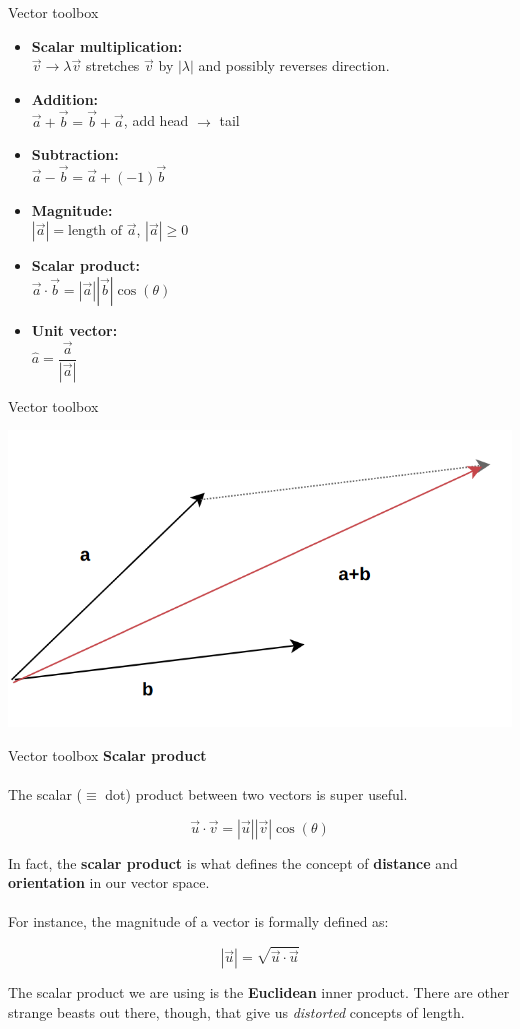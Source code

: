 \documentclass{beamer}
\begin{document}
\begin{frame}{Vector toolbox}
	\begin{itemize}
		\item \textbf{Scalar multiplication: }\\$\vec{v} \to \lambda \vec{v}$ stretches $\vec{v}$ by $|\lambda|$ and possibly reverses direction.
		\item \textbf{Addition: }\\$\vec{a} + \vec{b} = \vec{b} + \vec{a}$, add head $\to$ tail
		\item \textbf{Subtraction: }\\ $\vec{a} - \vec{b} = \vec{a} + (-1)\vec{b}$
		\item \textbf{Magnitude: }\\$|\vec{a}| = \text{length of }\vec{a}$, $|\vec{a}| \ge 0$
		\item \textbf{Scalar product: }\\ $\vec{a}\cdot\vec{b} = |\vec{a}||\vec{b}|\cos(\theta)$
		\item \textbf{Unit vector: }\\ $\hat{a} = \dfrac{\vec{a}}{|\vec{a}|}$
	\end{itemize}
\end{frame}

\begin{frame}{Vector toolbox}
	\begin{center}
	\includegraphics[width = 0.75\linewidth]{img/vector_addition.png}
	\end{center}
\end{frame}

\begin{frame}{Vector toolbox}
	\textbf{Scalar product}\\~\\
	The scalar ($\equiv$ dot) product between two vectors is super useful.
	
	$$\vec{u} \cdot \vec{v} = |\vec{u}||\vec{v}|\cos(\theta)$$
	
	In fact, the \textbf{scalar product} is what defines the concept of \textbf{distance} and \textbf{orientation} in our vector space.
	\\~\\
	For instance, the magnitude of a vector is formally defined as:
	
	$$|\vec{u}| = \sqrt{\vec{u}\cdot\vec{u}}$$
	
	The scalar product we are using is the \textbf{Euclidean} inner product. There are other strange beasts out there, though, that give us \textit{distorted} concepts of length.
\end{frame}
\end{document}
